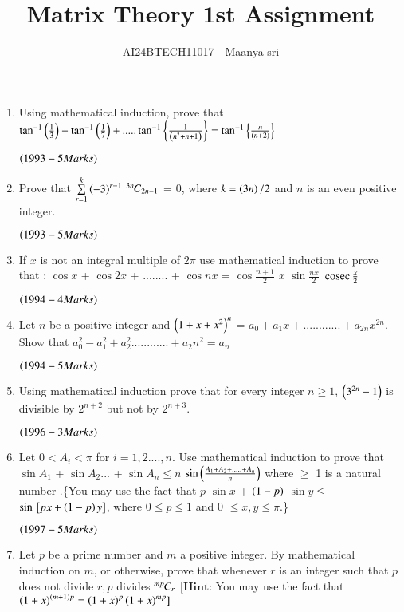 \documentclass[journal,12pt,twocolumn]{IEEEtran}
\theoremstyle{remark}
\begin{document}

\vspace{3cm}

\title{Matrix Theory 1st Assignment}
\author{AI24BTECH11017 - Maanya sri}
\maketitle
\newpage
\bigskip

\renewcommand{\thefigure}{\theenumi}
\renewcommand{\thetable}{\theenumi}\begin{enumerate}[start=16] 
	\item Using mathematical induction, prove that $\tan^{-1}\left(\frac{1}{3}\right)  +  \tan^{-1}\left(\frac{1}{7}\right) + .....\tan^{-1}\left\{\frac{1}{\left(n^2 + n + 1\right)}\right\} = \tan^{-1}\left\{\frac{n}{\left(n+2\right)}\right\}$ 

$\hfill{\brak{1993-5 Marks} }$
\item Prove that $\sum\limits^{k}_{r=1} \left(-3\right)^{r-1}$ ${{}^{3n}\mkern-1muC_{2n-1}}$ = $0$, where $k=\left(3n\right)/2$ and $n$ is an even positive integer.

$\hfill{\brak{1993-5 Marks} }$
\item If $x$ is not an integral multiple of $2\pi$ use mathematical induction to prove that : 
$\cos x$ + $\cos 2x$ + ........ + $\cos nx$ = $\cos\frac{n+1}{2}$ $x$ $\sin \frac{nx}{2}$ $\,\text{cosec}\,\frac{x}{2}$

$\hfill{\brak{1994-4 Marks}}$
\item 
Let $n$ be a positive integer and $\left(1+x+x^2\right)^n$ = $a_0 + a_1 x + ............+ a_{2n} x^{2n}$. Show that $a_0^2 - a_1^2 + a_2^2 ............ + a_2n^2 = a_n$

$\hfill{\brak{1994-5 Marks} }$
\item 
Using mathematical induction prove that for every integer $n \geq 1$, $\left(3^{2n} -1\right)$ is divisible by $2^{n+2}$ but not by $2^{n+3}$.

$\hfill{\brak{1996-3 Marks} }$
\item 
	Let $ 0<A_i<\pi$ for $i= 1,2....,n$. Use mathematical induction to prove that $\sin A_1$ + $\sin A_2$... + $\sin A_n \leq  n$  $\sin \left(\frac{A_1 + A_2 +.....+ A_n}{n}\right)$ where $\geq$ 1 is a natural number .\{You may use the fact that $p$ $\sin x$ + $\left(1-p\right)$ $\sin y\leq$ $\sin{}\left[px + \left(1-p\right)y\right]$, where $0 \leq p \leq 1 $ and 0 $\leq x,y \leq \pi $.\}

$\hfill{\brak{1997-5 Marks} }$
\item 
Let $p$ be a prime number and $m$ a positive integer. By mathematical induction on $m$, or otherwise, prove that whenever $r$ is an integer such that $p$ does not divide $r , p$ divides ${{}^{mp}\mkern-1muC_{r}}$
		$[ \textbf{Hint:}$ You may use the fact that $\left(1+x\right)^{\left(m+1\right)p} = \left(1+x\right)^p\left(1+x\right)^ {mp}]$


\end{enumerate}
\end{document}
